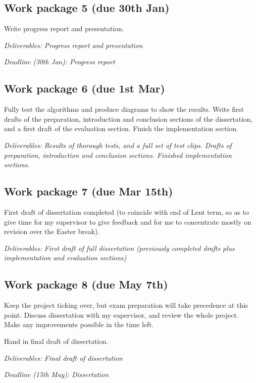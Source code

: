 \documentclass[12pt]{article}
\begin{document}
\subsection*{Work package 5 (due 30th Jan)}
Write progress report and presentation.

\emph{Deliverables: Progress report and presentation}

\emph{Deadline (30th Jan): Progress report}

\subsection*{Work package 6 (due 1st Mar)}
Fully test the algorithms and produce diagrams to show the results. Write first drafts of the preparation, introduction and conclusion sections of the dissertation, and a first draft of the evaluation section. Finish the implementation section.

\emph{Deliverables: Results of thorough tests, and a full set of test clips. Drafts of preparation, introduction and conclusion sections. Finished implementation sections.}

\subsection*{Work package 7 (due Mar 15th)}
First draft of dissertation completed (to coincide with end of Lent term, so as to give time for my supervisor to give feedback and for me to concentrate mostly on revision over the Easter break).

\emph{Deliverables: First draft of full dissertation (previously completed drafts plus implementation and evaluation sections)}

\subsection*{Work package 8 (due May 7th)}
Keep the project ticking over, but exam preparation will take precedence at this point. Discuss dissertation with my supervisor, and review the whole project. Make any improvements possible in the time left.

Hand in final draft of dissertation. 

\emph{Deliverables: Final draft of dissertation}

\emph{Deadline (15th May): Dissertation}
\end{document}
